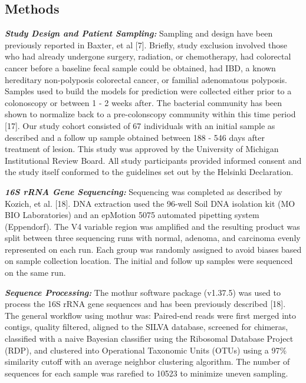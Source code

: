 \documentclass[12pt,]{article}
\begin{document}
\newpage

\subsection{Methods}\label{methods}

\textbf{\emph{Study Design and Patient Sampling:}} Sampling and design
have been previously reported in Baxter, et al {[}7{]}. Briefly, study
exclusion involved those who had already undergone surgery, radiation,
or chemotherapy, had colorectal cancer before a baseline fecal sample
could be obtained, had IBD, a known hereditary non-polyposis colorectal
cancer, or familial adenomatous polyposis. Samples used to build the
models for prediction were collected either prior to a colonoscopy or
between 1 - 2 weeks after. The bacterial community has been shown to
normalize back to a pre-colonscopy community within this time period
{[}17{]}. Our study cohort consisted of 67 individuals with an initial
sample as described and a follow up sample obtained between 188 - 546
days after treatment of lesion. This study was approved by the
University of Michigan Institutional Review Board. All study
participants provided informed consent and the study itself conformed to
the guidelines set out by the Helsinki Declaration.

\textbf{\emph{16S rRNA Gene Sequencing:}} Sequencing was completed as
described by Kozich, et al. {[}18{]}. DNA extraction used the 96-well
Soil DNA isolation kit (MO BIO Laboratories) and an epMotion 5075
automated pipetting system (Eppendorf). The V4 variable region was
amplified and the resulting product was split between three sequencing
runs with normal, adenoma, and carcinoma evenly represented on each run.
Each group was randomly assigned to avoid biases based on sample
collection location. The initial and follow up samples were sequenced on
the same run.

\textbf{\emph{Sequence Processing:}} The mothur software package
(v1.37.5) was used to process the 16S rRNA gene sequences and has been
previously described {[}18{]}. The general workflow using mothur was:
Paired-end reads were first merged into contigs, quality filtered,
aligned to the SILVA database, screened for chimeras, classified with a
naive Bayesian classifier using the Ribosomal Database Project (RDP),
and clustered into Operational Taxonomic Units (OTUs) using a 97\%
similarity cutoff with an average neighbor clustering algorithm. The
number of sequences for each sample was rarefied to 10523 to minimize
uneven sampling.
\end{document}
